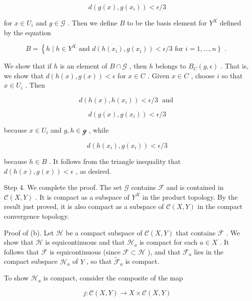 \[
d\left( {g\left( x\right) ,g\left( {x}_{i}\right) }\right)  < \epsilon /3
\]

for \(x \in  {U}_{i}\) and \(g \in  \mathcal{G}\) . Then we define \(B\) to be the basis element for \({Y}^{X}\) defined by the equation

\[
B = \left\{  {h \mid  h \in  {Y}^{X}}\right. \text{ and }d\left( {h\left( {x}_{i}\right) ,g\left( {x}_{i}\right) }\right)  < \epsilon /3\text{ for }\left. {i = 1,\ldots ,n}\right\}  \text{ . }
\]

We show that if \(h\) is an element of \(B \cap  \mathcal{G}\) , then \(h\) belongs to \({B}_{C}\left( {g,\epsilon }\right)\) . That is, we show that \(d\left( {h\left( x\right) ,g\left( x\right) }\right)  < \epsilon\) for \(x \in  C\) . Given \(x \in  C\) , choose \(i\) so that \(x \in  {U}_{i}\) . Then

\[
d\left( {h\left( x\right) ,h\left( {x}_{i}\right) }\right)  < \epsilon /3\;\text{ and }
\]

\[
d\left( {g\left( x\right) ,g\left( {x}_{i}\right) }\right)  < \epsilon /3
\]

because \(x \in  {U}_{i}\) and \(g,h \in  \mathcal{g}\) , while

\[
d\left( {h\left( {x}_{i}\right) ,g\left( {x}_{i}\right) }\right)  < \epsilon /3
\]

because \(h \in  B\) . It follows from the triangle inequality that \(d\left( {h\left( x\right) ,g\left( x\right) }\right)  < \epsilon\) , as desired.

Step 4. We complete the proof. The set \(\mathcal{G}\) contains \(\mathcal{F}\) and is contained in \(\mathcal{C}\left( {X,Y}\right)\) . It is compact as a subspace of \({Y}^{X}\) in the product topology. By the result just proved, it is also compact as a subspace of \(\mathcal{C}\left( {X,Y}\right)\) in the compact convergence topology.

Proof of (b). Let \(\mathcal{H}\) be a compact subspace of \(\mathcal{C}\left( {X,Y}\right)\) that contains \(\mathcal{F}\) . We show that \(\mathcal{H}\) is equicontinuous and that \({\mathcal{H}}_{a}\) is compact for each \(a \in  X\) . It follows that \(\mathcal{F}\) is equicontinuous (since \(\mathcal{F} \subset  \mathcal{H}\) ), and that \({\mathcal{F}}_{a}\) lies in the compact subspace \({\mathcal{H}}_{a}\) of \(Y\) , so that \({\widetilde{\mathcal{F}}}_{a}\) is compact.

To show \({\mathcal{H}}_{a}\) is compact, consider the composite of the map

\[
j : \mathcal{C}\left( {X,Y}\right)  \rightarrow  X \times  \mathcal{C}\left( {X,Y}\right)
\]

